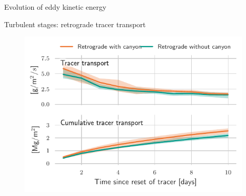 \documentclass{beamer}
\begin{document}
\begin{frame}{Evolution of eddy kinetic energy}
\end{frame}


\begin{frame}{Turbulent stages: retrograde tracer transport}
\begin{figure}
\centering
\includegraphics{figures/exchange_Retrograde_composite_Stratified.pdf}
\end{figure}
\end{frame}
\end{document}
